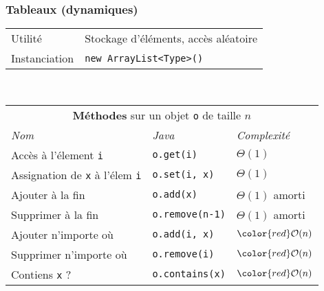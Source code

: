 \documentclass[8pt,aspectratio=169]{beamer}
\begin{document}
\begin{frame}
\frametitle{Tableaux (dynamiques)}
\centering
\begin{tabular}{ll}
	Utilité & Stockage d'éléments, accès aléatoire\\
	Instanciation & \texttt{new ArrayList<Type>()}\\
\end{tabular}\\
\vspace{0.5cm}
\centering
\begin{tabular}{lll}
	\multicolumn{3}{c}{\textbf{Méthodes} sur un objet \texttt{o} de taille $n$} \\
	\textit{Nom} & \textit{Java} & \textit{Complexité} \\
	Accès à l'élement \texttt{i} & \texttt{o.get(i)} & $\Theta(1)$\\
	Assignation de \texttt{x} à l'élem \texttt{i} & \texttt{o.set(i, x)} & $\Theta(1)$\\
	Ajouter à la fin & \texttt{o.add(x)} & $\Theta(1)$ \color{orange}amorti\\
	Supprimer à la fin & \texttt{o.remove(n-1)} & $\Theta(1)$ \color{orange}amorti\\
	Ajouter n'importe où & \texttt{o.add(i, x)} & $\color{red}\mathcal{O}(n)$\\
	Supprimer n'importe où & \texttt{o.remove(i)} & $\color{red}\mathcal{O}(n)$\\
	Contiens \texttt{x} ? & \texttt{o.contains(x)} & $\color{red}\mathcal{O}(n)$\\
\end{tabular}
\end{frame}
\end{document}
